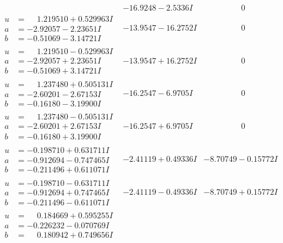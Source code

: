 \documentclass[1p]{elsarticle_modified}
\theoremstyle{definition}
\begin{document}
$$\begin{array}{c|c|c}
 & -16.9248 - 2.5336 I & \phantom{-0.000000 } 0 \\ \hline\begin{aligned}
u &= \phantom{-}1.219510 + 0.529963 I \\
a &= -2.92057 - 2.23651 I \\
b &= -0.51069 - 3.14721 I\end{aligned}
 & -13.9547 - 16.2752 I & \phantom{-0.000000 } 0 \\ \hline\begin{aligned}
u &= \phantom{-}1.219510 - 0.529963 I \\
a &= -2.92057 + 2.23651 I \\
b &= -0.51069 + 3.14721 I\end{aligned}
 & -13.9547 + 16.2752 I & \phantom{-0.000000 } 0 \\ \hline\begin{aligned}
u &= \phantom{-}1.237480 + 0.505131 I \\
a &= -2.60201 - 2.67153 I \\
b &= -0.16180 - 3.19900 I\end{aligned}
 & -16.2547 - 6.9705 I & \phantom{-0.000000 } 0 \\ \hline\begin{aligned}
u &= \phantom{-}1.237480 - 0.505131 I \\
a &= -2.60201 + 2.67153 I \\
b &= -0.16180 + 3.19900 I\end{aligned}
 & -16.2547 + 6.9705 I & \phantom{-0.000000 } 0 \\ \hline\begin{aligned}
u &= -0.198710 + 0.631711 I \\
a &= -0.912694 - 0.747465 I \\
b &= -0.211496 + 0.611071 I\end{aligned}
 & -2.41119 + 0.49336 I & -8.70749 - 0.15772 I \\ \hline\begin{aligned}
u &= -0.198710 - 0.631711 I \\
a &= -0.912694 + 0.747465 I \\
b &= -0.211496 - 0.611071 I\end{aligned}
 & -2.41119 - 0.49336 I & -8.70749 + 0.15772 I \\ \hline\begin{aligned}
u &= \phantom{-}0.184669 + 0.595255 I \\
a &= -0.226232 - 0.070769 I \\
b &= \phantom{-}0.180942 + 0.749656 I\end{aligned}

\end{array}$$
\end{document}
